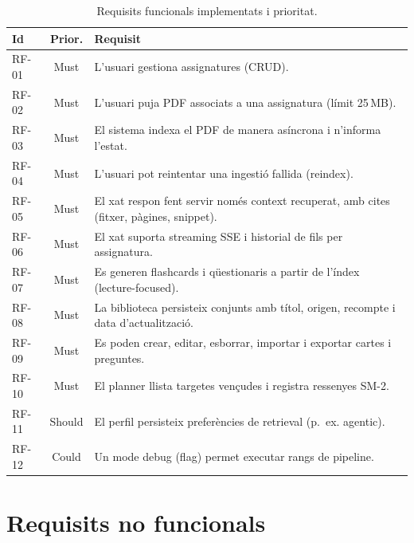 \begin{table}[htbp]
\centering
\caption{Requisits funcionals implementats i prioritat.}
\label{tab:rf}
\small
\begin{tabularx}{\textwidth}{lcX}
\toprule
Id & Prior. & Requisit \\
\midrule
RF-01 & Must & L'usuari gestiona assignatures (CRUD). \\
RF-02 & Must & L'usuari puja PDF associats a una assignatura (límit 25\,MB). \\
RF-03 & Must & El sistema indexa el PDF de manera asíncrona i n'informa l'estat. \\
RF-04 & Must & L'usuari pot reintentar una ingestió fallida (reindex). \\
RF-05 & Must & El xat respon fent servir només context recuperat, amb cites (fitxer, pàgines, snippet). \\
RF-06 & Must & El xat suporta streaming SSE i historial de fils per assignatura. \\
RF-07 & Must & Es generen flashcards i qüestionaris a partir de l'índex (lecture-focused). \\
RF-08 & Must & La biblioteca persisteix conjunts amb títol, origen, recompte i data d'actualització. \\
RF-09 & Must & Es poden crear, editar, esborrar, importar i exportar cartes i preguntes. \\
RF-10 & Must & El planner llista targetes vençudes i registra ressenyes SM-2. \\
RF-11 & Should & El perfil persisteix preferències de retrieval (p.~ex. agentic). \\
RF-12 & Could & Un mode debug (flag) permet executar rangs de pipeline. \\
\bottomrule
\end{tabularx}
\end{table}

\section{Requisits no funcionals}

